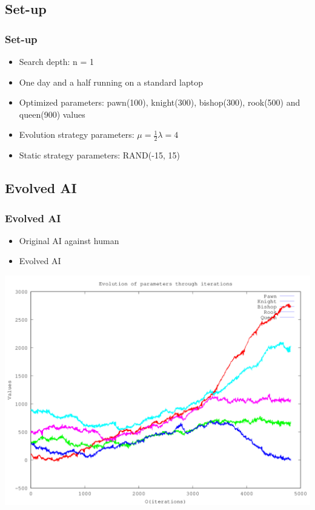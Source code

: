 \documentclass{beamer}
\begin{document}
\begin{frame}
\subsection{Set-up}
\frametitle{Set-up}
\begin{itemize}
\item Search depth: n = 1
\item One day and a half running on a standard laptop
\item Optimized parameters: pawn(100), knight(300), bishop(300), rook(500) and queen(900) values
\item Evolution strategy parameters: $\mu = \frac{1}{2} \lambda = 4$
\item Static strategy parameters: RAND(-15, 15)
\end{itemize}
\end{frame}

\begin{frame}
\subsection{Evolved AI}
\frametitle{Evolved AI}
\begin{itemize}
\item Original AI against human
\item Evolved AI
\end{itemize}
\end{frame}

\begin{frame}
\begin{center}
\includegraphics[scale=0.5]{../results/history_individuals_1.png}
\end{center}
\end{frame}
\end{document}
